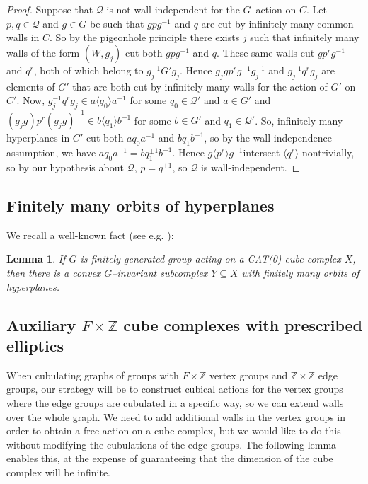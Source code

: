 \documentclass[11pt,oneside]{amsart}
\newtheorem{lem}[thm]{Lemma}
\theoremstyle{definition}
\newcommand{\field}[1]{\mathbb{#1}}
\newcommand{\integers}{\ensuremath{\field{Z}}}
\begin{document}
\begin{proof}
Suppose that $\mathcal Q$ is not wall-independent for the $G$--action on $C$.  Let $p,q\in\mathcal Q$ and $g\in G$ be such that  $gpg^{-1}$ and $q$ are cut by infinitely many common walls in $C$.  So by the pigeonhole principle there exists $j$ such that infinitely many walls of the form $(W,g_j)$ cut both $gpg^{-1}$ and $q$.  These same walls cut $gp^rg^{-1}$ and $q^r$, both of which belong to $g_j^{-1}G'g_j$.  Hence $g_jg p^rg^{-1}g_j^{-1}$ and $g_j^{-1}q^rg_j$ are elements of $G'$ that are both cut by infinitely many walls for the action of $G'$ on $C'$.  Now, $g_j^{-1}q^rg_j \in a \langle q_0\rangle a^{-1}$ for some $q_0\in\mathcal Q'$ and $a\in G'$ and $(g_jg)p^r(g_jg)^{-1}\in b\langle q_1\rangle b^{-1}$ for some $b\in G'$ and $q_1\in \mathcal Q'$.  So, infinitely many hyperplanes in $C'$ cut both $aq_0a^{-1}$ and $bq_1b^{-1}$, so by the wall-independence assumption, we have $aq_0a^{-1}=bq_1^{\pm1}b^{-1}$.  Hence $g\langle p^r\rangle g^{-1}$intersect $\langle q^r\rangle$ nontrivially, so by our hypothesis about $\mathcal Q$, $p=q^{\pm1}$, so $\mathcal Q$ is wall-independent.   
\end{proof}

\subsection{Finitely many orbits of hyperplanes}\label{subsec:essential-core}
We recall a well-known fact (see e.g. \cite{CapraceSageev:rank}):

\begin{lem}\label{lem:finitely-many-orbits}
 If $G$ is finitely-generated group acting on a CAT(0) cube complex $X$,  then there is a convex $G$--invariant subcomplex $Y\subseteq X$ with finitely many orbits of hyperplanes.
\end{lem}


\subsection{Auxiliary $F\times\integers$ cube complexes with prescribed elliptics}\label{subsec:small-cancellation-free-times-Z}
When cubulating graphs of groups with $F\times\integers$ vertex groups and $\integers\times\integers$ edge groups, our strategy will be to construct cubical actions for the vertex groups where the edge groups are cubulated in a specific way, so we can extend walls over the whole graph.  We need to add additional walls in the vertex groups in order to obtain a free action on a cube complex, but we would like to do this without modifying the cubulations of the edge groups.  The following lemma enables this, at the expense of guaranteeing that the dimension of the cube complex will be infinite.
\end{document}
